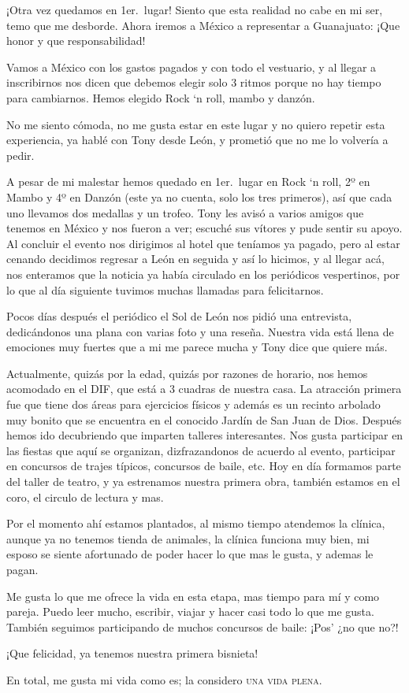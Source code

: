 \documentclass[letterpaper, 12pt]{book}
\begin{document}
¡Otra vez quedamos en 1er.\ lugar! Siento que esta realidad no cabe en mi ser, temo que me desborde. Ahora iremos a México a representar a Guanajuato: ¡Que honor y que responsabilidad!

Vamos a México con los gastos pagados y con todo el vestuario, y al llegar a inscribirnos nos dicen que debemos elegir solo 3 ritmos porque no hay tiempo para cambiarnos. Hemos elegido Rock `n roll, mambo y danzón.

No me siento cómoda, no me gusta estar en este lugar y no quiero repetir esta experiencia, ya hablé con Tony desde León, y prometió que no me lo volvería a pedir. 

A pesar de mi malestar hemos quedado en 1er.\ lugar en Rock `n roll, 2º en Mambo y 4º en Danzón (este ya no cuenta, solo los tres primeros), así que cada uno llevamos dos medallas y un trofeo. Tony les avisó a varios amigos que tenemos en México y nos fueron a ver; escuché sus vítores y pude sentir su apoyo. Al concluir el evento nos dirigimos al hotel que teníamos ya pagado, pero al estar cenando decidimos regresar a León en seguida y así lo hicimos, y al llegar acá, nos enteramos que la noticia ya había circulado en los periódicos vespertinos, por lo que al día siguiente tuvimos muchas llamadas para felicitarnos.

Pocos días después el periódico el Sol de León nos pidió una entrevista, dedicándonos una plana con varias foto y una reseña.
Nuestra vida está llena de emociones muy fuertes que a mi me parece mucha y Tony dice que quiere más.

Actualmente, quizás por la edad, quizás por razones de horario, nos hemos acomodado en el DIF, que está a 3 cuadras de nuestra casa. La atracción primera fue que tiene dos áreas para ejercicios físicos y además es un recinto arbolado muy bonito que se encuentra en el conocido Jardín de San Juan de Dios. Después hemos ido decubriendo que imparten talleres interesantes. Nos gusta participar en las fiestas que aquí se organizan, dizfrazandonos de acuerdo al evento, participar en concursos de trajes típicos, concursos de baile, etc.
Hoy en día formamos parte del taller de teatro, y ya estrenamos nuestra primera obra, también estamos en el coro, el circulo de lectura y mas.

Por el momento ahí estamos plantados, al mismo tiempo atendemos la clínica, aunque ya no tenemos tienda de animales, la clínica funciona muy bien, mi esposo se siente afortunado de poder hacer lo que mas le gusta, y ademas le pagan.

Me gusta lo que me ofrece la vida en esta etapa, mas tiempo para mí y como pareja. Puedo leer mucho, escribir, viajar y hacer casi todo lo que me gusta. También seguimos participando de muchos concursos de baile: ¡Pos' ¿no que no?!

¡Que felicidad, ya tenemos nuestra primera bisnieta!

En total, me gusta mi vida como es; la  considero \textsc{una vida plena}.
\end{document}
